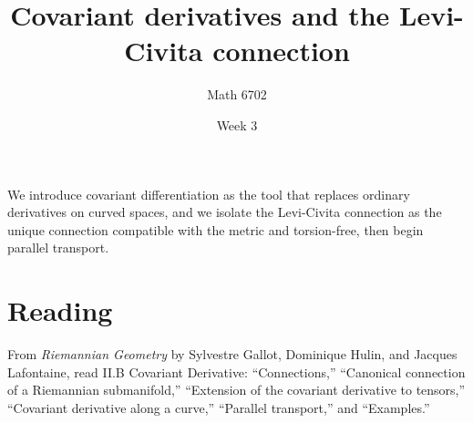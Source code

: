 \documentclass{article}
\title{Covariant derivatives and the Levi-Civita connection}
\author{Math 6702}
\date{Week 3}
\begin{document}
\maketitle

We introduce covariant differentiation as the tool that replaces ordinary derivatives on curved spaces, and we isolate the Levi-Civita connection as the unique connection compatible with the metric and torsion-free, then begin parallel transport.

\section*{Reading}
From \textit{Riemannian Geometry} by Sylvestre Gallot, Dominique Hulin, and Jacques Lafontaine, read \textsection II.B Covariant Derivative: ``Connections,'' ``Canonical connection of a Riemannian submanifold,'' ``Extension of the covariant derivative to tensors,'' ``Covariant derivative along a curve,'' ``Parallel transport,'' and ``Examples.''
\end{document}
